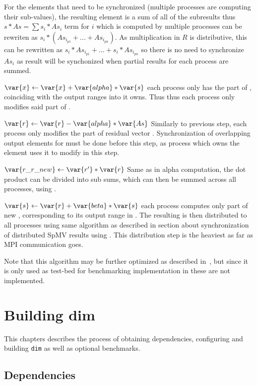 \documentclass[thesis=M,english]{FITthesis}[2019/12/23]
\begin{document}
For the elements that need to be synchronized (multiple processes are computing their sub-values),
the resulting element is a sum of all of the subresults thus $s * As = \sum s_i * As_i$ term for $i$
which is computed by multiple processes can be rewriten as $s_i * (As_{i_{p1}} + ... + As_{i_{pn}})$.
As multiplication in $R$ is distributive, this can be rewritten as $s_i * As_{i_{p1}} + ... + s_i * As_{i_{pn}}$
so there is no need to synchronize $As_i$ as result will be synchonized when partial results for
each process are summed.

$\var{x} \gets \var{x} + \var{alpha} * \var{s}$ each process only has the part of ,
coinciding with the output ranges into  it owns. Thus thus each process only
modifies said part of .

$\var{r} \gets \var{r} - \var{alpha} * \var{As}$ Similarly to previous step, each process
only modifies the part of residual vector . Synchronization of overlapping
output elements for  must be done before this step, as process which owns the
element uses it to modify  in this step.

$\var{r\_r\_new} \gets \var{r'} * \var{r}$ Same as in alpha computation, the dot product
can be divided into sub sums, which can then be summed across all processes, using
.

$\var{s} \gets \var{r} + \var{beta} * \var{s}$ each process computes only part of new
, corresponding to its output range in . The resulting  is
then distributed to all processes using same algorithm as described in section
about synchronization of distributed SpMV results using .
This distribution step is the heaviest as far as MPI communication goes.

Note that this algorithm may be further optimized as described in~\cite{distCGwRedSync}, but
since it is only used as test-bed for benchmarking implementation in  these are not
implemented.

\chapter{Building dim}

This chapters describes the process of obtaining dependencies, configuring and building \texttt{dim} as well
as optional benchmarks.

\section{Dependencies}\label{bdim:deps}
\end{document}
